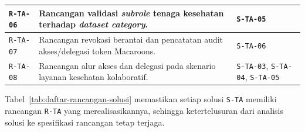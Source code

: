 \begin{table}[H]
\begin{tabular}{|p{}|p{}|p{}|}
		\texttt{R-TA-06} & Rancangan validasi \textit{subrole} tenaga kesehatan terhadap \textit{dataset category}.                                                                 & \texttt{S-TA-05}                                                       \\ \hline
		\texttt{R-TA-07} & Rancangan revokasi berantai dan pencatatan audit akses/delegasi token Macaroons.                                                                         & \texttt{S-TA-06}                                                       \\ \hline
		\texttt{R-TA-08} & Rancangan alur akses dan delegasi pada skenario layanan kesehatan kolaboratif.                                                                           & \texttt{S-TA-03}, \texttt{S-TA-04}, \texttt{S-TA-05}                   \\ \hline
	\end{tabular}
\end{table}

Tabel~\ref{tab:daftar-rancangan-solusi} memastikan setiap solusi \texttt{S-TA} memiliki rancangan \texttt{R-TA} yang merealisasikannya, sehingga ketertelusuran dari analisis solusi ke spesifikasi rancangan tetap terjaga.
